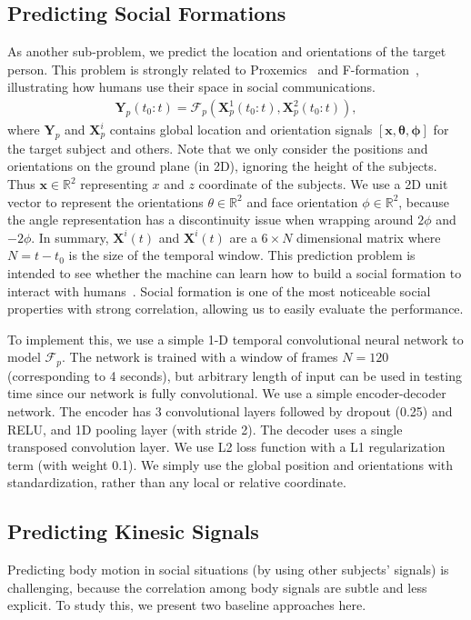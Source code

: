 \subsection{Predicting Social Formations}
As another sub-problem, we predict the location and orientations of the target person. This problem is strongly related to Proxemics~\cite{Hall66} and F-formation~\cite{kendon90}, illustrating how humans use their space in social communications.
\begin{gather}	
 \mathbf{Y}_p (t_0:t) = \mathcal{F}_p ( \mathbf{X}_p^1(t_0:t), \mathbf{X}_p^2(t_0:t)),
 \label{eq:pred_formation}
\end{gather}
where $\mathbf{Y}_p$ and $\mathbf{X}_p^i$ contains global location and orientation signals $[\mathbf{x}, \boldsymbol{\theta}, \boldsymbol{\phi} ]$ for the target subject and others.
Note that we only consider the positions and orientations on the ground plane (in 2D), ignoring the height of the subjects. Thus $\mathbf{x} \in \mathbb{R}^2 $ representing $x$ and $z$ coordinate of the subjects. We use a 2D unit vector to represent the orientations $\theta \in \mathbb {R}^2$ and face orientation $\phi \in \mathbb{R}^2$, because the angle representation has a discontinuity issue when wrapping around $2\phi$ and $-2\phi$. In summary, $\mathbf{X}^i(t)$ and $\mathbf{X}^i(t)$ are a $6 \times N$ dimensional matrix where $N = t- t_0$ is the size of the temporal window. This prediction problem is intended to see whether the machine can learn how to build a social formation to interact with humans~\cite{vazquez2017towards}. Social formation is one of the most noticeable social properties with strong correlation, allowing us to easily evaluate the performance.


To implement this, we use a simple 1-D temporal convolutional neural network to model $\mathcal{F}_p$. The network is trained with a window of frames $N=120$ (corresponding to 4 seconds), but arbitrary length of input can be used in testing time since our network is fully convolutional. We use a simple encoder-decoder network. The encoder has  3 convolutional layers followed by dropout (0.25) and RELU, and 1D pooling layer (with stride 2). The decoder uses a single transposed convolution layer. We use L2 loss function with a L1 regularization term (with weight 0.1). We simply use the global position and orientations with standardization, rather than any local or relative coordinate.

\subsection{Predicting Kinesic Signals}
Predicting body motion in social situations (by using other subjects' signals) is challenging, because the correlation among body signals are subtle and less explicit. To study this, we present two baseline approaches here. 

